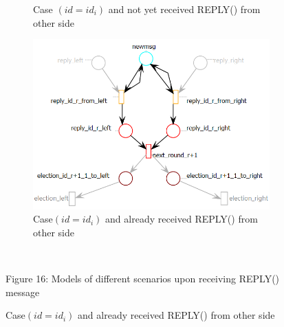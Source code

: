 \documentclass{article}
\begin{document}
\begin{figure}[ht]
\begin{subfigure}[b]{0.4\linewidth}
			\caption{Case $(id=id_i)$ and not yet received REPLY() from other side} 
			\label{fig14:b} 
			\vspace{4ex}
		\end{subfigure} 
		\begin{subfigure}[b]{1\linewidth}
			\centering
			\hspace*{30pt}
			\includegraphics[scale=0.6]{reply_cas3} 
			\caption{Case$(id=id_i)$ and already received REPLY() from other side} 
			\label{fig14:c} 
		\end{subfigure}
		\\\begin{center}
			Figure 16: Models of different scenarios upon receiving REPLY() message
		\end{center}
		\label{fig14} 
	\end{figure}
\end{document}

